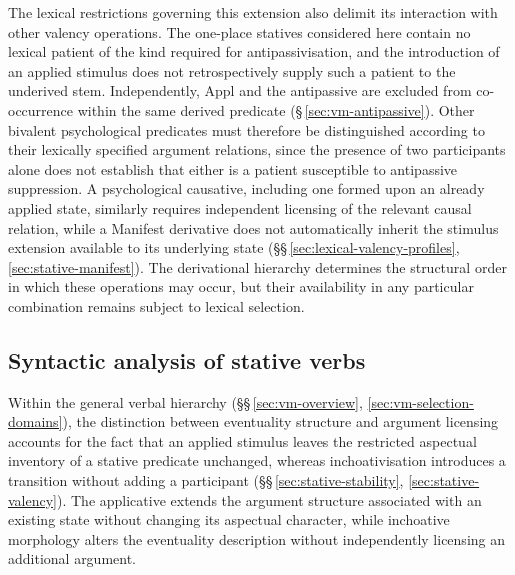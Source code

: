 The lexical restrictions governing this extension also delimit its
interaction with other valency operations. The one-place statives
considered here contain no lexical patient of the kind required for
antipassivisation, and the introduction of an applied stimulus does not
retrospectively supply such a patient to the underived stem.
Independently, Appl and the antipassive are excluded from co-occurrence
within the same derived predicate (§\,\ref{sec:vm-antipassive}). Other
bivalent psychological predicates must therefore be distinguished
according to their lexically specified argument relations, since the
presence of two participants alone does not establish that either is a
patient susceptible to antipassive suppression. A psychological causative,
including one formed upon an already applied state, similarly requires
independent licensing of the relevant causal relation, while a Manifest
derivative does not automatically inherit the stimulus extension available
to its underlying state
(§§\,\ref{sec:lexical-valency-profiles}, \ref{sec:stative-manifest}). The
derivational hierarchy determines the structural order in which these
operations may occur, but their availability in any particular combination
remains subject to lexical selection.

\subsection{Syntactic analysis of stative verbs}
\label{sec:vm-tension-stative}

Within the general verbal hierarchy (§§\,\ref{sec:vm-overview},
\ref{sec:vm-selection-domains}), the distinction between eventuality structure
and argument licensing accounts for the fact that an applied stimulus leaves
the restricted aspectual inventory of a stative predicate unchanged, whereas
inchoativisation introduces a transition without adding a participant
(§§\,\ref{sec:stative-stability}, \ref{sec:stative-valency}). The applicative
extends the argument structure associated with an existing state without
changing its aspectual character, while inchoative morphology alters the
eventuality description without independently licensing an additional argument.

